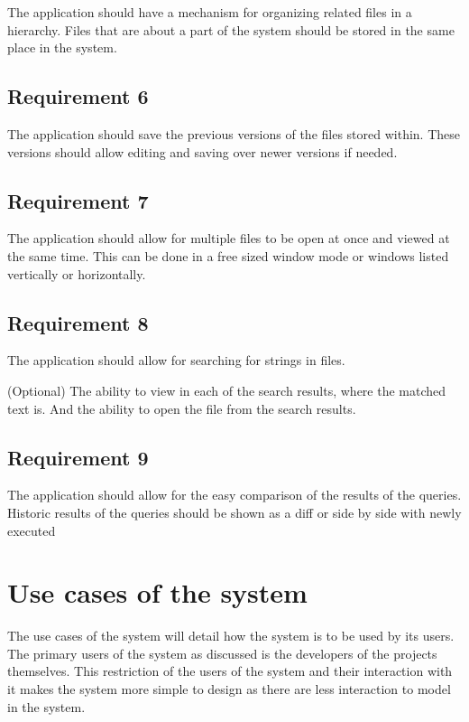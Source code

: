 The application should have a mechanism for organizing related files in
a hierarchy. Files that are about a part of the system should be stored
in the same place in the system.

\subsection{Requirement 6}\label{requirement-6}
The application should save the previous versions of the files stored within. These
versions should allow editing and saving over newer versions if needed.

\subsection{Requirement 7}\label{requirement-7}
The application should allow for multiple files to
be open at once and viewed at the same time. This can be done in a free
sized window mode or windows listed vertically or horizontally.

\subsection{Requirement 8}\label{requirement-8}
The application should allow for searching for strings in
files.

(Optional) The ability to view in each of the search results, where the
matched text is. And the ability to open the file from the search
results.

\subsection{Requirement 9}\label{requirement-9}
The application should allow for the easy
comparison of the results of the queries. Historic results of the
queries should be shown as a diff or side by side with newly executed

\section{Use cases of the system}\label{use-cases-of-the-system}

The use cases of the system will detail how the system is to be used by
its users. The primary users of the system as discussed is the
developers of the projects themselves. This restriction of the users of
the system and their interaction with it makes the system more simple to
design as there are less interaction to model in the system.

